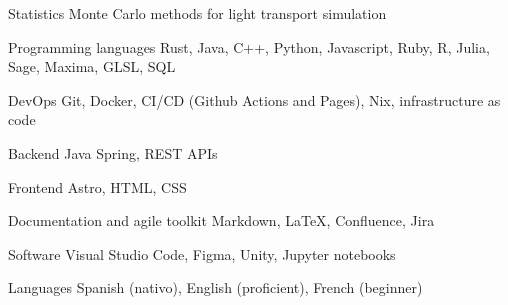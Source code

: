 

\begin{cvskills}

  \cvskill
    {Statistics}
    {Monte Carlo methods for light transport simulation}

  \cvskill
    {Programming languages}
    {Rust, Java, C++, Python, Javascript, Ruby, R, Julia, Sage, Maxima, GLSL, SQL} %

  \cvskill
    {DevOps} %
    {Git, Docker, CI/CD (Github Actions and Pages), Nix, infrastructure as code}

  \cvskill
    {Backend} %
    {Java Spring, REST APIs} %

  \cvskill
    {Frontend} %
    {Astro, HTML, CSS} %

  \cvskill
    {Documentation and agile toolkit}
    {Markdown, LaTeX, Confluence, Jira}

  \cvskill
    {Software}
    {Visual Studio Code, Figma, Unity, Jupyter notebooks}

  \cvskill
    {Languages} %
    {Spanish (nativo), English (proficient), French (beginner)} %

\end{cvskills}
